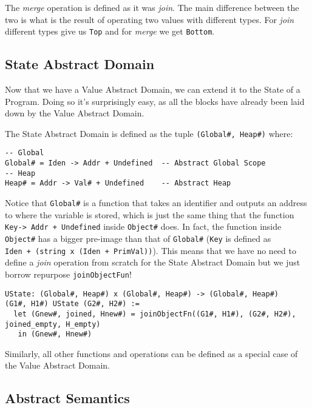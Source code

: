 The \emph{merge} operation is defined as it was \emph{join}. The main
difference between the two is what is the result of operating two values
with different types. For \emph{join} different types give us
\texttt{Top} and for \emph{merge} we get \texttt{Bottom}.

\subsection{State Abstract Domain}\label{state-abstract-domain-1}

Now that we have a Value Abstract Domain, we can extend it to the State
of a Program. Doing so it's surprisingly easy, as all the blocks have
already been laid down by the Value Abstract Domain.

The State Abstract Domain is defined as the tuple
\texttt{(Global\#,\ Heap\#)} where:

\begin{verbatim}
-- Global
Global# = Iden -> Addr + Undefined  -- Abstract Global Scope
-- Heap
Heap# = Addr -> Val# + Undefined    -- Abstract Heap
\end{verbatim}

Notice that \texttt{Global\#} is a function that takes an identifier and
outputs an address to where the variable is stored, which is just the
same thing that the function
\texttt{Key-\textgreater{}\ Addr\ +\ Undefined} inside \texttt{Object\#}
does. In fact, the function inside \texttt{Object\#} has a bigger
pre-image than that of \texttt{Global\#} (\texttt{Key} is defined as
\texttt{Iden\ +\ (string\ x\ (Iden\ +\ PrimVal))}). This means that we
have no need to define a \emph{join} operation from scratch for the
State Abstract Domain but we just borrow repurpose
\texttt{joinObjectFun}!

\begin{verbatim}
UState: (Global#, Heap#) x (Global#, Heap#) -> (Global#, Heap#)
(G1#, H1#) UState (G2#, H2#) :=
  let (Gnew#, joined, Hnew#) = joinObjectFn((G1#, H1#), (G2#, H2#), joined_empty, H_empty)
   in (Gnew#, Hnew#)
\end{verbatim}

Similarly, all other functions and operations can be defined as a special
case of the Value Abstract Domain.

\subsection{Abstract Semantics}\label{abstract-semantics-1}

